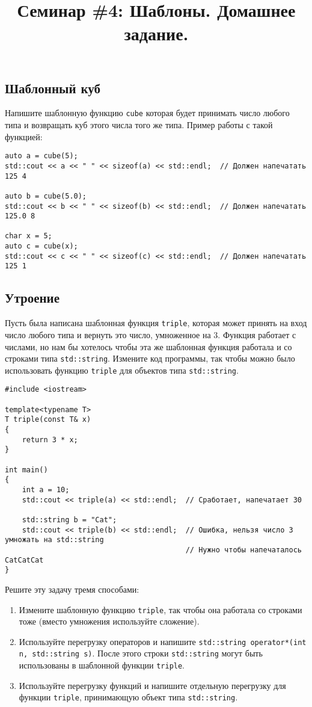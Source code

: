 \documentclass{article}
\begin{document}
\title{Семинар \#4: Шаблоны. Домашнее задание.\vspace{-5ex}}\date{}\maketitle




\subsection{Шаблонный куб}
Напишите шаблонную функцию \texttt{cube} которая будет принимать число любого типа и возвращать куб этого числа того же типа. Пример работы с такой функцией:
\begin{lstlisting}
auto a = cube(5);
std::cout << a << " " << sizeof(a) << std::endl;  // Должен напечатать  125 4

auto b = cube(5.0);
std::cout << b << " " << sizeof(b) << std::endl;  // Должен напечатать  125.0 8

char x = 5;
auto c = cube(x);
std::cout << c << " " << sizeof(c) << std::endl;  // Должен напечатать  125 1
\end{lstlisting}


\subsection{Утроение}
Пусть была написана шаблонная функция \texttt{triple}, которая может принять на вход число любого типа и вернуть это число, умноженное на 3. Функция работает с числами, но нам бы хотелось чтобы эта же шаблонная функция работала и со строками типа \texttt{std::string}. Измените код программы, так чтобы можно было использовать функцию \texttt{triple} для объектов типа \texttt{std::string}.
\begin{lstlisting}
#include <iostream>

template<typename T>
T triple(const T& x)
{
	return 3 * x;
}

int main()
{
	int a = 10;
	std::cout << triple(a) << std::endl;  // Сработает, напечатает 30
	
	std::string b = "Cat";
	std::cout << triple(b) << std::endl;  // Ошибка, нельзя число 3 умножать на std::string
	                                      // Нужно чтобы напечаталось CatCatCat
}
\end{lstlisting}
Решите эту задачу тремя способами:
\begin{enumerate}
\item Измените шаблонную функцию \texttt{triple}, так чтобы она работала со строками тоже (вместо умножения используйте сложение).
\item Используйте перегрузку операторов и напишите \lstinline|std::string operator*(int n, std::string s)|. После этого строки \texttt{std::string} могут быть использованы в шаблонной функции \texttt{triple}.
\item Используйте перегрузку функций и напишите отдельную перегрузку для функции \texttt{triple}, принимающую объект типа \texttt{std::string}.
 
\end{enumerate}
\end{document}
